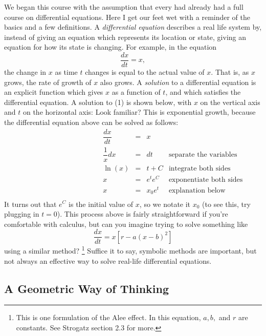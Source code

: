 \documentclass[a5paper]{article}
\theoremstyle{definition}%
\numberwithin{exercise}{section}
\theoremstyle{remark}%
\begin{document}
We began this course with the assumption that every had already had a full course on differential equations. Here I get our feet wet with a reminder of the basics and a few definitions. A \emph{differential equation} describes a real life system by, instead of giving an equation which represents its location or state, giving an equation for how its state is changing. For example, in the equation 
\begin{equation}
\frac{dx}{dt}=x,
\end{equation}
the change in $x$ as time $t$ changes is equal to the actual value of $x$. That is, as $x$ grows, the rate of growth of $x$ also grows. A \emph{solution} to a differential equation is an explicit function which gives $x$ as a function of $t$, and which satisfies the differential equation. A solution to (1) is shown below, with $x$ on the vertical axis and $t$ on the horizontal axis:
Look familiar? This is exponential growth, because the differential equation above can be solved as follows:
\[\begin{array}{rrcll}
&\dfrac{dx}{dt}&=&x\\
&\dfrac{1}{x}dx &=& dt & \text{separate the variables}\\
&\ln(x)&=&t+C& \text{integrate both sides}\\
\phantom{\text{exponentiate both sides}}&x&=&e^t e^C& \text{exponentiate both sides}\\
&x&=&x_0 e^t& \text{explanation below}\\
\end{array}\]
It turns out that $e^C$ is the initial value of $x$, so we notate it $x_0$ (to see this, try plugging in $t=0$). This process above is fairly straightforward if you're comfortable with calculus, but can you imagine trying to solve something like 
$$\dfrac{dx}{dt}=x\left[r-a(x-b)^2\right]$$
using a similar method? \footnote{This is one formulation of the Alee effect. In this equation, $a,b,$ and $r$ are constants. See Strogatz section 2.3 for more.} Suffice it to say, symbolic methods are important, but not always an effective way to solve real-life differential equations. 

\subsection{A Geometric Way of Thinking}

\end{document}
